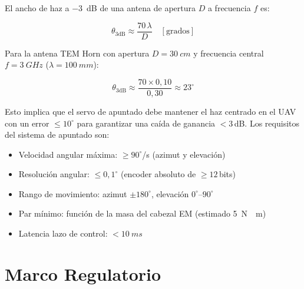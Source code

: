\documentclass[12pt,a4paper]{article}
\begin{document}
El ancho de haz a \SI{-3}{dB} de una antena de apertura $D$
a frecuencia $f$ es:

\begin{equation}
  \theta_{3\mathrm{dB}} \approx \frac{70\,\lambda}{D} \quad [\text{grados}]
  \label{eq:haz}
\end{equation}

Para la antena TEM Horn con apertura $D = \SI{30}{cm}$
y frecuencia central $f = \SI{3}{GHz}$ ($\lambda = \SI{100}{mm}$):

\begin{equation}
  \theta_{3\mathrm{dB}} \approx \frac{70 \times 0{,}10}{0{,}30} \approx 23^{\circ}
\end{equation}

Esto implica que el servo de apuntado debe mantener el haz centrado
en el UAV con un error $\leq 10^{\circ}$ para garantizar una caída de ganancia
$< 3$\,dB. Los requisitos del sistema de apuntado son:

\begin{itemize}[noitemsep]
  \item Velocidad angular máxima: $\geq 90^{\circ}$/s (azimut y elevación)
  \item Resolución angular: $\leq 0{,}1^{\circ}$ (encoder absoluto de $\geq 12$\,bits)
  \item Rango de movimiento: azimut $\pm 180^{\circ}$, elevación $0^{\circ}$–$90^{\circ}$
  \item Par mínimo: función de la masa del cabezal EM (estimado \SI{5}{N\cdot m})
  \item Latencia lazo de control: $< \SI{10}{ms}$
\end{itemize}

\newpage

\section{Marco Regulatorio}
\end{document}
